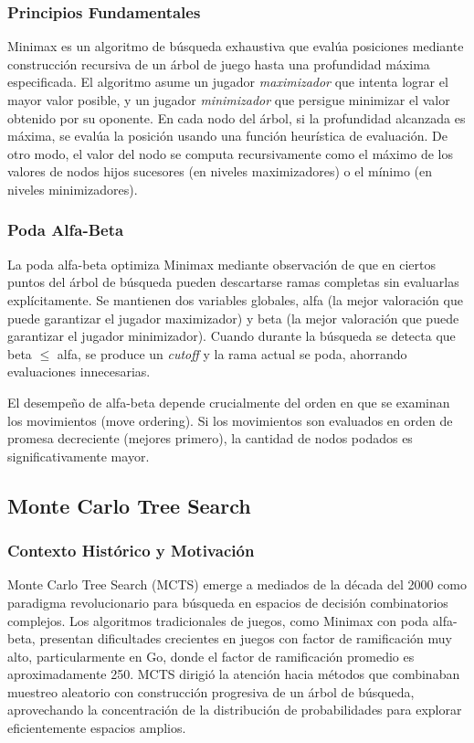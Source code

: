 \documentclass[12pt]{article}
\begin{document}
\subsubsection{Principios Fundamentales}

Minimax es un algoritmo de búsqueda exhaustiva que evalúa posiciones mediante construcción recursiva de un árbol de juego hasta una profundidad máxima especificada. El algoritmo asume un jugador \textit{maximizador} que intenta lograr el mayor valor posible, y un jugador \textit{minimizador} que persigue minimizar el valor obtenido por su oponente. En cada nodo del árbol, si la profundidad alcanzada es máxima, se evalúa la posición usando una función heurística de evaluación. De otro modo, el valor del nodo se computa recursivamente como el máximo de los valores de nodos hijos sucesores (en niveles maximizadores) o el mínimo (en niveles minimizadores).

\subsubsection{Poda Alfa-Beta}

La poda alfa-beta optimiza Minimax mediante observación de que en ciertos puntos del árbol de búsqueda pueden descartarse ramas completas sin evaluarlas explícitamente. Se mantienen dos variables globales, alfa (la mejor valoración que puede garantizar el jugador maximizador) y beta (la mejor valoración que puede garantizar el jugador minimizador). Cuando durante la búsqueda se detecta que beta $\leq$ alfa, se produce un \textit{cutoff} y la rama actual se poda, ahorrando evaluaciones innecesarias.

El desempeño de alfa-beta depende crucialmente del orden en que se examinan los movimientos (move ordering). Si los movimientos son evaluados en orden de promesa decreciente (mejores primero), la cantidad de nodos podados es significativamente mayor.

\subsection{Monte Carlo Tree Search}

\subsubsection{Contexto Histórico y Motivación}

Monte Carlo Tree Search (MCTS) emerge a mediados de la década del 2000 como paradigma revolucionario para búsqueda en espacios de decisión combinatorios complejos. Los algoritmos tradicionales de juegos, como Minimax con poda alfa-beta, presentan dificultades crecientes en juegos con factor de ramificación muy alto, particularmente en Go, donde el factor de ramificación promedio es aproximadamente 250. MCTS dirigió la atención hacia métodos que combinaban muestreo aleatorio con construcción progresiva de un árbol de búsqueda, aprovechando la concentración de la distribución de probabilidades para explorar eficientemente espacios amplios.
\end{document}
